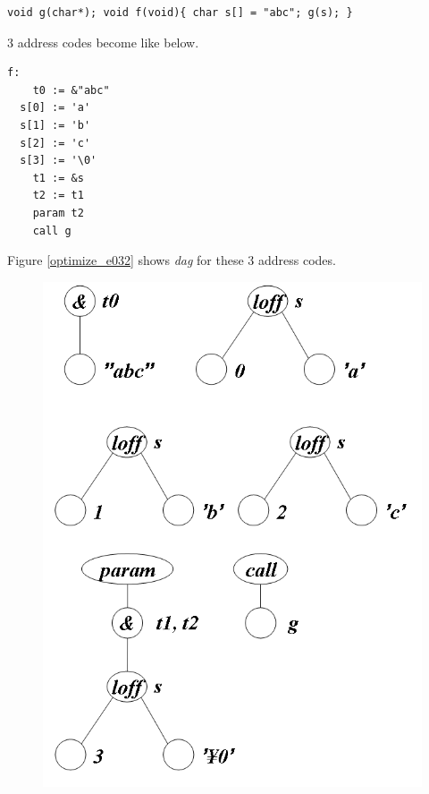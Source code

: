 \begin{Example}
\label{optimize_e031}
\begin{verbatim}
void g(char*); void f(void){ char s[] = "abc"; g(s); }
\end{verbatim}
3 address codes become like below.
\begin{verbatim}
f:
    t0 := &"abc"
  s[0] := 'a'
  s[1] := 'b'
  s[2] := 'c'
  s[3] := '\0'
    t1 := &s
    t2 := t1
    param t2
    call g
\end{verbatim}
Figure \ref{optimize_e032} shows {\em dag} for these 3 address codes.
\begin{figure}[htbp]
\begin{center}
\begin{htmlonly}
\includegraphics[width=0.859\linewidth,height=1.0\linewidth]{opt016.png}
\end{htmlonly}
\begin{latexonly}

\end{latexonly}
\end{center}
\end{figure}
\end{Example}
